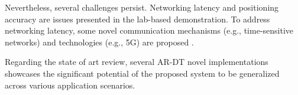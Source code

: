 \begin{enumerate}
    Nevertheless, several challenges persist. Networking latency and positioning accuracy are issues presented in the lab-based demonstration. To address networking latency, some novel communication mechanisms (e.g., time-sensitive networks) and technologies (e.g., 5G) are proposed \cite{LI2022102321}. 



    Regarding the state of art review, several \ac{AR}-\ac{DT} novel implementations showcases the significant potential of the proposed system to be generalized across various application scenarios.
\end{enumerate}




